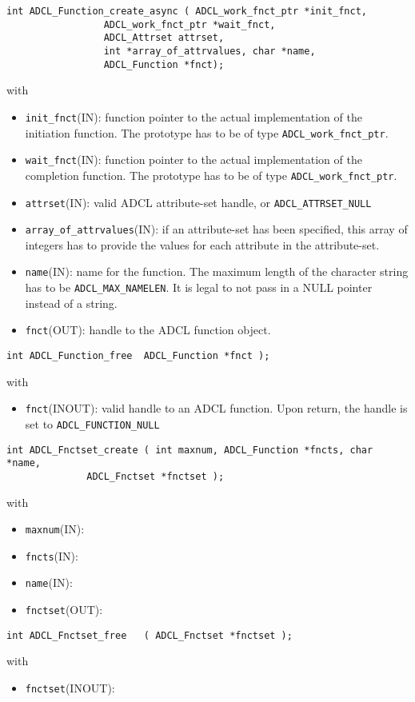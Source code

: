 \begin{verbatim}
int ADCL_Function_create_async ( ADCL_work_fnct_ptr *init_fnct, 
				 ADCL_work_fnct_ptr *wait_fnct, 
				 ADCL_Attrset attrset, 
				 int *array_of_attrvalues, char *name,  
				 ADCL_Function *fnct);

\end{verbatim}
with
\begin{itemize}
\item {\tt init\_fnct}(IN): function pointer to the actual implementation of the initiation function. The prototype has
     to be of type {\tt ADCL\_work\_fnct\_ptr}.
\item {\tt wait\_fnct}(IN): function pointer to the actual implementation of the completion function. The prototype has
     to be of type {\tt ADCL\_work\_fnct\_ptr}.
\item {\tt attrset}(IN): valid ADCL attribute-set handle, or {\tt ADCL\_ATTRSET\_NULL}
\item {\tt array\_of\_attrvalues}(IN): if an attribute-set has been specified, this array of
 integers has to provide the values for each attribute in the attribute-set. 
\item {\tt name}(IN): name for the function. The maximum length of the character string has to be 
  {\tt ADCL\_MAX\_NAMELEN}. It is legal to not pass in a NULL pointer instead of a string.
\item {\tt fnct}(OUT): handle to the ADCL function object.
\end{itemize}


\begin{verbatim}
int ADCL_Function_free  ADCL_Function *fnct );

\end{verbatim}
with
\begin{itemize}
\item {\tt fnct}(INOUT): valid handle to an ADCL function. Upon return, the handle is set to {\tt ADCL\_FUNCTION\_NULL}
\end{itemize}


\begin{verbatim}
int ADCL_Fnctset_create ( int maxnum, ADCL_Function *fncts, char *name, 
			  ADCL_Fnctset *fnctset );
\end{verbatim}
with
\begin{itemize}
\item {\tt maxnum}(IN):
\item {\tt fncts}(IN):
\item {\tt name}(IN):
\item {\tt fnctset}(OUT):
\end{itemize}

\begin{verbatim}
int ADCL_Fnctset_free   ( ADCL_Fnctset *fnctset );
\end{verbatim}
with
\begin{itemize}
\item {\tt fnctset}(INOUT):
\end{itemize}
